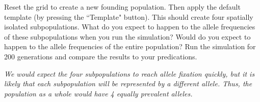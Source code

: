\documentclass[12pt]{article}
\begin{document}
\begin{spacing}{1.6}
\begin{enumerate}
\par Reset the grid to create a new founding population. Then apply the default template (by pressing the ``Template" button). This should create four spatially isolated subpopulations. What do you expect to happen to the allele frequencies of these subpopulations when you run the simulation? Would do you expect to happen to the allele frequencies of the entire population? Run the simulation for 200 generations and compare the results to your predications.
\par \textit{We would expect the four subpopulations to reach allele fixation quickly, but it is likely that each subpopulation will be represented by a different allele. Thus, the population as a whole would have 4 equally prevalent alleles.}
\end{enumerate}


\end{spacing}
\end{document}
